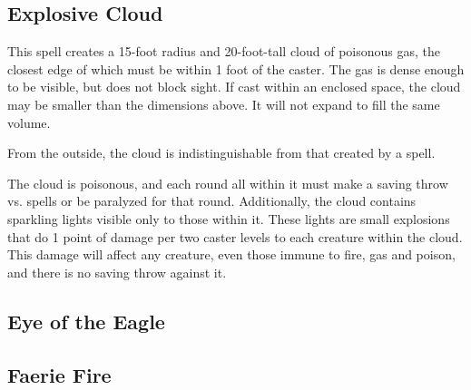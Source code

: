 \begin{multicols*}{2}
\subsection{Explosive Cloud}\label{spell:Explosive Cloud}

This spell creates a 15-foot radius and 20-foot-tall cloud of poisonous gas, the closest edge of which must be within 1 foot of the caster. The gas is dense enough to be visible, but does not block sight. If cast within an enclosed space, the cloud may be smaller than the dimensions above. It will not expand to fill the same volume.

From the outside, the cloud is indistinguishable from that created by a  spell.

The cloud is poisonous, and each round all within it must make a saving throw vs. spells or be paralyzed for that round. Additionally, the cloud contains sparkling lights visible only to those within it. These lights are small explosions that do 1 point of damage per two caster levels to each creature within the cloud. This damage will affect any creature, even those immune to fire, gas and poison, and there is no saving throw against it.

\subsection{Eye of the Eagle}\label{spell:Eye of the Eagle}



\subsection{Faerie Fire}\label{spell:Faerie Fire}


\end{multicols*}
